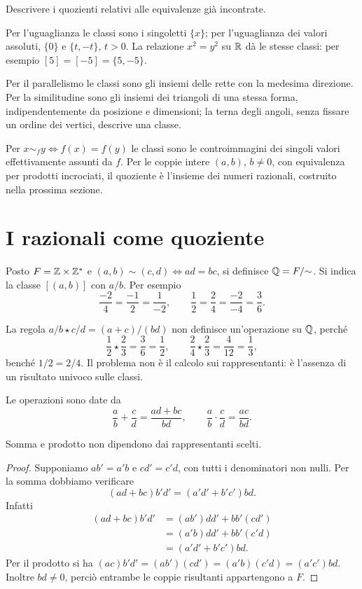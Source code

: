\begin{esercizio}
Descrivere i quozienti relativi alle equivalenze già incontrate.
\end{esercizio}
\begin{svolgimento}
Per l'uguaglianza le classi sono i singoletti $\{x\}$; per l'uguaglianza dei valori assoluti, $\{0\}$ e $\{t,-t\}$, $t>0$. La relazione $x^2=y^2$ su $\mathbb{R}$ dà le stesse classi: per esempio $[5]=[-5]=\{5,-5\}$.

Per il parallelismo le classi sono gli insiemi delle rette con la medesima direzione. Per la similitudine sono gli insiemi dei triangoli di una stessa forma, indipendentemente da posizione e dimensioni; la terna degli angoli, senza fissare un ordine dei vertici, descrive una classe.

Per $x\sim_f y\iff f(x)=f(y)$ le classi sono le controimmagini dei singoli valori effettivamente assunti da $f$. Per le coppie intere $(a,b)$, $b\ne0$, con equivalenza per prodotti incrociati, il quoziente è l'insieme dei numeri razionali, costruito nella prossima sezione.
\end{svolgimento}

\section{I razionali come quoziente}
\begin{definizione}
Posto $F=\mathbb{Z}\times\mathbb{Z}^*$ e $(a,b)\sim(c,d)\iff ad=bc$, si definisce $\mathbb{Q}=F/{\sim}$. Si indica la classe $[(a,b)]$ con $a/b$. Per esempio
\[
\frac{-2}{4}=\frac{-1}{2}=\frac{1}{-2},
\qquad \frac12=\frac24=\frac{-2}{-4}=\frac36.
\]
\end{definizione}

\begin{esempio}
La regola $a/b\star c/d=(a+c)/(bd)$ non definisce un'operazione su $\mathbb{Q}$, perché
\[
\frac12\star\frac23=\frac36=\frac12,
\qquad
\frac24\star\frac23=\frac4{12}=\frac13,
\]
benché $1/2=2/4$. Il problema non è il calcolo sui rappresentanti: è l'assenza di un risultato univoco sulle classi.
\end{esempio}

Le operazioni sono date da
\[
\frac ab+\frac cd=\frac{ad+bc}{bd},
\qquad \frac ab\cdot\frac cd=\frac{ac}{bd}.
\]

\begin{proposizione}
Somma e prodotto non dipendono dai rappresentanti scelti.
\end{proposizione}
\begin{proof}
Supponiamo $ab'=a'b$ e $cd'=c'd$, con tutti i denominatori non nulli. Per la somma dobbiamo verificare
\[
(ad+bc)b'd'=(a'd'+b'c')bd.
\]
Infatti
\[
\begin{aligned}
(ad+bc)b'd'&=(ab')dd'+bb'(cd')\\
&=(a'b)dd'+bb'(c'd)\\
&=(a'd'+b'c')bd.
\end{aligned}
\]
Per il prodotto si ha $(ac)b'd'=(ab')(cd')=(a'b)(c'd)=(a'c')bd$. Inoltre $bd\ne0$, perciò entrambe le coppie risultanti appartengono a $F$.
\end{proof}


